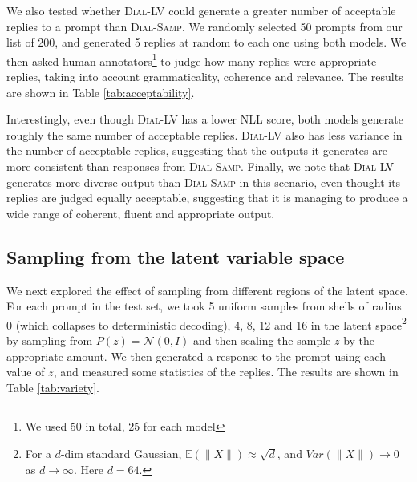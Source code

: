 We also tested whether \textsc{Dial-LV} could generate a greater number of acceptable replies to a prompt than \textsc{Dial-Samp}. We randomly selected 50 prompts from our list of 200, and generated 5 replies at random to each one using both models. We then asked human annotators\footnote{We used 50 in total, 25 for each model} to judge how many replies were appropriate replies, taking into account grammaticality, coherence and relevance. The results are shown in Table \ref{tab:acceptability}.

Interestingly, even though \textsc{Dial-LV} has a lower NLL score, both models generate roughly the same number of acceptable replies. \textsc{Dial-LV} also has less variance in the number of acceptable replies, suggesting that the outputs it generates are more consistent than responses from \textsc{Dial-Samp}. Finally, we note that \textsc{Dial-LV} generates more diverse output than \textsc{Dial-Samp} in this scenario, even thought its replies are judged equally acceptable, suggesting that it is managing to produce a wide range of coherent, fluent and appropriate output.

\subsection{Sampling from the latent variable space}

\begin{table}[t]
\caption{Statistics of responses generated from the \textsc{Dial-LV} model from different regions of the hidden state space.}
\label{tab:variety}
\end{table}

We next explored the effect of sampling from different regions of the latent space. For each prompt in the test set, we took 5 uniform samples from shells of radius 0 (which collapses to deterministic decoding), 4, 8, 12 and 16 in the latent space\footnote{For a $d$-dim standard Gaussian, $\mathbb{E}(\|X\|) \approx \sqrt{d}$, and $Var(\|X\|) \to 0$ as $d \to \infty$. Here $d=64$.} by sampling from $P(z) = \mathcal{N}(0, I)$ and then scaling the sample $z$ by the appropriate amount. We then generated a response to the prompt using each value of $z$, and measured some statistics of the replies. The results are shown in Table \ref{tab:variety}.

